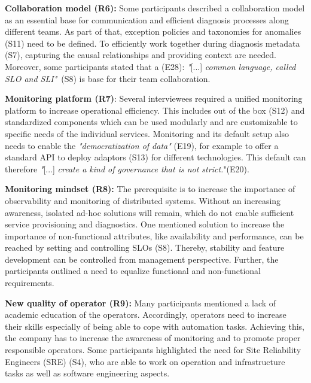 \documentclass[runningheads]{llncs}
\begin{document}
\textbf{Collaboration model (R6):}
Some participants described a collaboration model as an essential base for communication and efficient diagnosis processes along different teams. As part of that, exception policies and taxonomies for anomalies (S11) need to be defined. To efficiently work together during diagnosis metadata (S7), capturing the causal relationships and providing context are needed. Moreover, some participants stated that a (E28): \textit{"}[...] \textit{common language, called SLO and SLI"}~(S8) is base for their team collaboration.

\textbf{Monitoring platform (R7)}: Several interviewees required a unified monitoring platform to increase operational efficiency. This includes out of the box (S12) and standardized components which can be used modularly and are customizable to specific needs of the individual services. Monitoring and its default setup also needs to enable the \textit{"democratization of data"} (E19), for example to offer a standard API to deploy adaptors (S13) for different technologies. This default can therefore
\textit{"}[...] \textit{create a kind of governance that is not strict.}"(E20).

\textbf{Monitoring mindset (R8):} The prerequisite is to increase the importance of observability and monitoring of distributed systems. Without an increasing awareness, isolated ad-hoc solutions will remain, which do not enable sufficient service provisioning and diagnostics. One mentioned solution to increase the importance of non-functional attributes, like availability and performance, can be reached by setting and controlling SLOs (S8). Thereby, stability and feature development can be controlled from management perspective. Further, the participants outlined a need to equalize functional and non-functional requirements.

\textbf{New quality of operator (R9):} Many participants mentioned a lack of academic education of the operators. Accordingly, operators need to increase their skills especially of being able to cope with automation tasks. Achieving this, the company has to increase the awareness of monitoring and to promote proper responsible operators. Some participants highlighted the need for Site Reliability Engineers (SRE) (S4), who are able to work on operation and infrastructure tasks as well as software engineering aspects.
\end{document}
